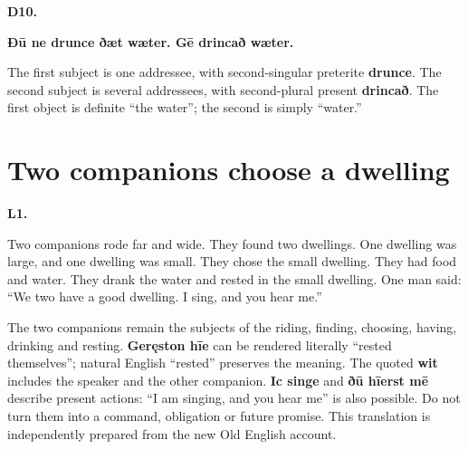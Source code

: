 \par\begin{minipage}{\linewidth}\raggedright
\textbf{D10.}

\textbf{Ðū ne drunce ðæt wæter. Gē drincað wæter.}

The first subject is one addressee, with second-singular preterite \textbf{drunce}. The second subject is several addressees, with second-plural present \textbf{drincað}. The first object is definite “the water”; the second is simply “water.”

\end{minipage}\par\addvspace{4pt}

\section*{Two companions choose a dwelling}

\par\begin{minipage}{\linewidth}\raggedright
\textbf{L1.}

Two companions rode far and wide. They found two dwellings. One dwelling was large, and one dwelling was small. They chose the small dwelling. They had food and water. They drank the water and rested in the small dwelling. One man said: “We two have a good dwelling. I sing, and you hear me.”

The two companions remain the subjects of the riding, finding, choosing, having, drinking and resting. \textbf{Geręston hīe} can be rendered literally “rested themselves”; natural English “rested” preserves the meaning. The quoted \textbf{wit} includes the speaker and the other companion. \textbf{Ic singe} and \textbf{ðū hīerst mē} describe present actions: “I am singing, and you hear me” is also possible. Do not turn them into a command, obligation or future promise. This translation is independently prepared from the new Old English account.

\end{minipage}\par\addvspace{4pt}

